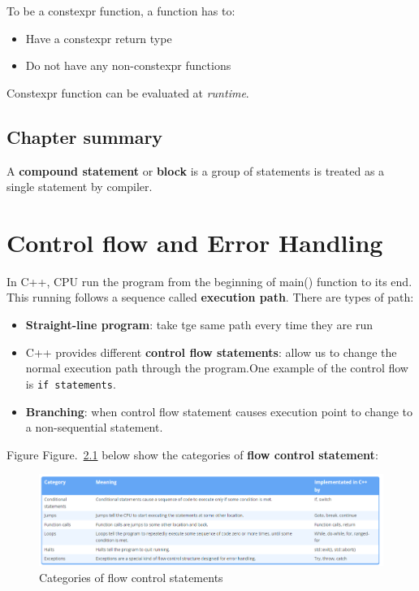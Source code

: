 \documentclass[
  letterpaper,
  DIV=11,
  numbers=noendperiod]{scrreprt}
\providecommand{\tightlist}{%
  \setlength{\itemsep}{0pt}\setlength{\parskip}{0pt}}\usepackage{longtable,booktabs,array}
\begin{document}
To be a constexpr function, a function has to:

\begin{itemize}
\tightlist
\item
  Have a constexpr return type
\item
  Do not have any non-constexpr functions
\end{itemize}

Constexpr function can be evaluated at \emph{runtime}.

\hypertarget{chapter-summary}{%
\section{Chapter summary}\label{chapter-summary}}

A \textbf{compound statement} or \textbf{block} is a group of statements
is treated as a single statement by compiler.


\hypertarget{control-flow-and-error-handling}{%
\chapter{Control flow and Error
Handling}\label{control-flow-and-error-handling}}

In C++, CPU run the program from the beginning of main() function to its
end. This running follows a sequence called \textbf{execution path}.
There are types of path:

\begin{itemize}
\tightlist
\item
  \textbf{Straight-line program}: take tge same path every time they are
  run
\item
  C++ provides different \textbf{control flow statements}: allow us to
  change the normal execution path through the program.One example of
  the control flow is \texttt{if\ statements}.
\item
  \textbf{Branching}: when control flow statement causes execution point
  to change to a non-sequential statement.
\end{itemize}

Figure Figure.~\ref{fig-flow-categories} below show the categories of
\textbf{flow control statement}:

\begin{figure}

{\centering \includegraphics[width=11.51in,height=\textheight]{./figure/c7_flow_categories.PNG}

}

\caption{\label{fig-flow-categories}Categories of flow control
statements}

\end{figure}
\end{document}

